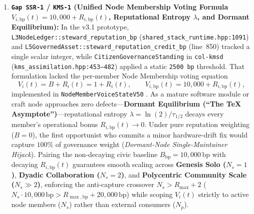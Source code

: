\begin{enumerate}
  \item \textbf{\texttt{Gap SSR-1} / \texttt{KMS-1} (Unified Node Membership Voting Formula $V_{i,\mathrm{bp}}(t) = 10{,}000 + R_{i,\mathrm{bp}}(t)$, Reputational Entropy $\lambda$, and Dormant Equilibrium):}
  In the v3.1 prototype, \texttt{L3NodeLedger::steward\_reputation\_bp} (\texttt{shared\_stack\_runtime.hpp:1091}) and \texttt{L5GovernedAsset::steward\_reputation\_credit\_bp} (line~850) tracked a single scalar integer, while \texttt{CitizenGovernanceStanding} in \texttt{col-kmsd} (\texttt{kms\_assimilation.hpp:453--482}) applied a static \texttt{2500 bp} threshold. That formulation lacked the per-member Node Membership voting equation
  \[
    V_i(t) = B + R_i(t) = 1 + R_i(t), \qquad V_{i,\mathrm{bp}}(t) = 10{,}000 + R_{i,\mathrm{bp}}(t),
  \]
  implemented in \texttt{NodeMemberVoiceStateV50} \parencite{ostrom1990}. As a mature software module or craft node approaches zero defects---\textbf{Dormant Equilibrium (``The \TeX{} Asymptote'')}---reputational entropy $\lambda = \ln(2)/\tau_{1/2}$ decays every member's operational bonus $R_{i,\mathrm{bp}}(t) \to 0$. Under pure reputation weighting ($B=0$), the first opportunist who commits a minor hardware-drift fix would capture $100\%$ of governance weight (\emph{Dormant-Node Single-Maintainer Hijack}). Pairing the non-decaying civic baseline $B_{\mathrm{bp}} = 10{,}000\,\mathrm{bp}$ with decaying $R_{i,\mathrm{bp}}(t)$ guarantees smooth scaling across \textbf{Genesis Solo ($N_s=1$)}, \textbf{Dyadic Collaboration ($N_s=2$)}, and \textbf{Polycentric Community Scale ($N_s \gg 2$)}, enforcing the anti-capture crossover $N_s > R_{\max} + 2$ ($N_s \cdot 10{,}000\,\mathrm{bp} > R_{\max,\mathrm{bp}} + 20{,}000\,\mathrm{bp}$) while scoping $V_i(t)$ strictly to active node members ($N_s$) rather than external consumers ($N_p$).


\end{enumerate}
